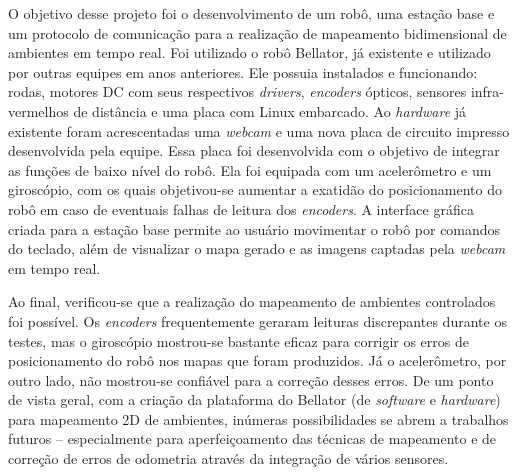 \documentclass[oneside,a4paper,12pt]{normas-utf-tex}
\begin{document}
\capa
\folhaderosto

\begin{resumo}

O objetivo desse projeto foi o desenvolvimento de um robô, uma estação base e um protocolo de comunicação para a realização de mapeamento bidimensional de ambientes em tempo real. Foi utilizado o robô Bellator, já existente e utilizado por outras equipes em anos anteriores. Ele possuia instalados e funcionando: rodas, motores DC com seus respectivos \textit{drivers}, \textit{encoders} ópticos, sensores infra-vermelhos de distância e uma placa com Linux embarcado. Ao \textit{hardware} já existente foram acrescentadas uma \textit{webcam} e uma nova placa de circuito impresso desenvolvida pela equipe. Essa placa foi desenvolvida com o objetivo de integrar as funções de baixo nível do robô. Ela foi equipada com um acelerômetro e um giroscópio, com os quais objetivou-se aumentar a exatidão do posicionamento do robô em caso de eventuais falhas de leitura dos \textit{encoders}. A interface gráfica criada para a estação base permite ao usuário movimentar o robô por comandos do teclado, além de visualizar o mapa gerado e as imagens captadas pela \textit{webcam} em tempo real.

Ao final, verificou-se que a realização do mapeamento de ambientes controlados foi possível. Os \textit{encoders} frequentemente geraram leituras discrepantes durante os testes, mas o giroscópio mostrou-se bastante eficaz para corrigir os erros de posicionamento do robô nos mapas que foram produzidos. Já o acelerômetro, por outro lado, não mostrou-se confiável para a correção desses erros. De um ponto de vista geral, com a criação da plataforma do Bellator (de \textit{software} e \textit{hardware}) para mapeamento 2D de ambientes, inúmeras possibilidades se abrem a trabalhos futuros -- especialmente para aperfeiçoamento das técnicas de mapeamento e de correção de erros de odometria através da integração de vários sensores.

\end{resumo}
\end{document}
